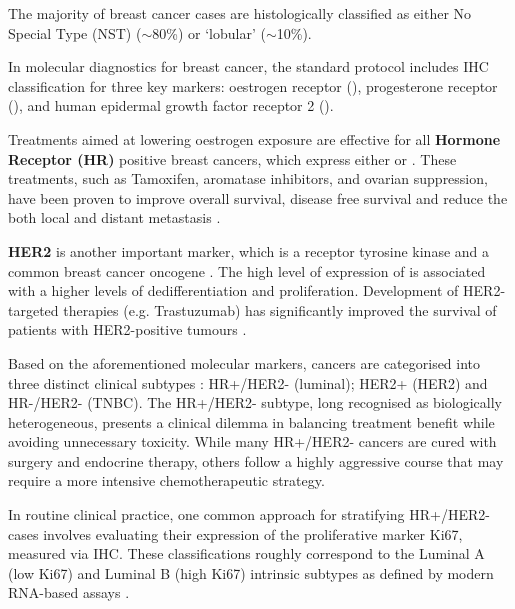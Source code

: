 The majority of breast cancer cases are histologically classified as either No Special Type (NST) ($\sim$80\%) or `lobular' ($\sim$10\%).

In molecular diagnostics for breast cancer, the standard protocol includes \ac{IHC} classification for three key markers: oestrogen receptor (), progesterone receptor (), and human epidermal growth factor receptor 2 ().

Treatments aimed at lowering oestrogen exposure are effective for all \textbf{Hormone Receptor (HR)} positive breast cancers, which express either  or . These treatments, such as Tamoxifen, aromatase inhibitors, and ovarian suppression, have been proven to improve overall survival, disease free survival and reduce the both local and distant metastasis \parencite{Early_Breast_Cancer_Trialists_Collaborative_Group_EBCTCG2005-mk}.

\textbf{HER2} is another important marker, which is a receptor tyrosine kinase and a common breast cancer oncogene . The high level of expression of  is associated with a higher levels of dedifferentiation and proliferation. Development of HER2-targeted therapies (e.g. Trastuzumab) has significantly improved the survival of patients with HER2-positive tumours \parencite{Slamon2001-qs}. 

Based on the aforementioned molecular markers, cancers are categorised into three distinct clinical subtypes : HR+/HER2- (luminal); HER2+ (HER2) and HR-/HER2- (\acs{TNBC}). The HR+/HER2- subtype, long recognised as biologically heterogeneous, presents a clinical dilemma in balancing treatment benefit while avoiding unnecessary toxicity. While many HR+/HER2- cancers are cured with surgery and endocrine therapy, others follow a highly aggressive course that may require a more intensive chemotherapeutic strategy.


In routine clinical practice, one common approach for stratifying HR+/HER2- cases involves evaluating their expression of the proliferative marker Ki67, measured via \ac{IHC}. These classifications roughly correspond to the Luminal A (low Ki67) and Luminal B (high Ki67) intrinsic subtypes as defined by modern RNA-based assays .


